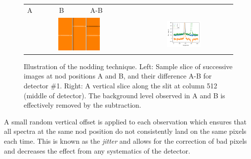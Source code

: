 \begin{figure}
    \centering

      \begin{tabularx}{0.75\textwidth}{|*6{Y|}|}    %
      A & B & A-B& & & \\
         &
        \\
    \end{tabularx}
    \caption{Illustration of the nodding technique. Left: Sample slice of successive images at nod positions A and B, and their difference A-B for detector \#1. Right: A vertical slice along the slit at column 512 (middle of detector). The background level observed in A and B is effectively removed by the subtraction.}
    \label{fig:nodimages}
\end{figure}

A small random vertical offset is applied to each observation which ensures that all spectra at the same nod position do not consistently land on the same pixels each time. This is known as the \emph{jitter} and allows for the correction of bad pixels and decreases the effect from any systematics of the detector.



